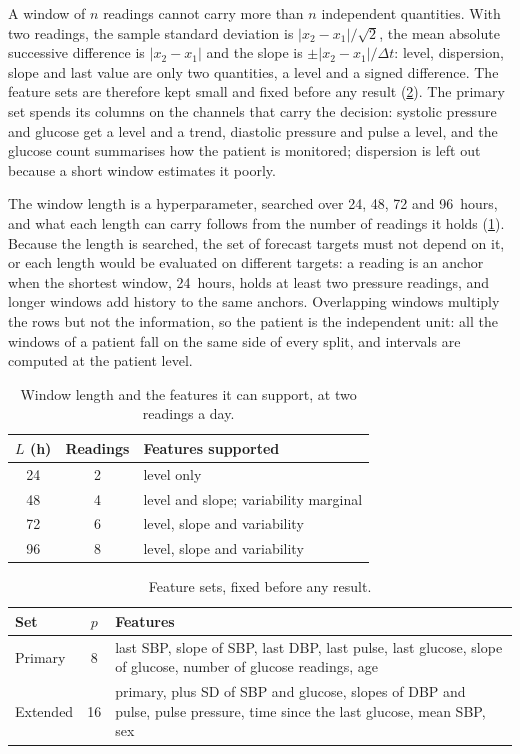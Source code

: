 \documentclass[11pt,a4paper,oneside]{report}
\begin{document}
A window of $n$ readings cannot carry more than $n$ independent quantities. With two readings, the sample standard deviation is $\lvert x_2 - x_1\rvert/\sqrt{2}$, the mean absolute successive difference is $\lvert x_2 - x_1\rvert$ and the slope is $\pm\lvert x_2 - x_1\rvert/\Delta t$: level, dispersion, slope and last value are only two quantities, a level and a signed difference. The feature sets are therefore kept small and fixed before any result (\cref{tab:feature-sets}). The primary set spends its columns on the channels that carry the decision: systolic pressure and glucose get a level and a trend, diastolic pressure and pulse a level, and the glucose count summarises how the patient is monitored; dispersion is left out because a short window estimates it poorly.

The window length is a hyperparameter, searched over 24, 48, 72 and 96~hours, and what each length can carry follows from the number of readings it holds (\cref{tab:window-length}). Because the length is searched, the set of forecast targets must not depend on it, or each length would be evaluated on different targets: a reading is an anchor when the shortest window, 24~hours, holds at least two pressure readings, and longer windows add history to the same anchors. Overlapping windows multiply the rows but not the information, so the patient is the independent unit: all the windows of a patient fall on the same side of every split, and intervals are computed at the patient level.

\begin{table}[htbp]
\centering\footnotesize
\caption{Window length and the features it can support, at two readings a day.}\label{tab:window-length}
\begin{tabular}{@{}ccl@{}}
\toprule
\textbf{$L$ (h)} & \textbf{Readings} & \textbf{Features supported} \\
\midrule
24 & 2 & level only \\
48 & 4 & level and slope; variability marginal \\
72 & 6 & level, slope and variability \\
96 & 8 & level, slope and variability \\
\bottomrule
\end{tabular}
\end{table}

\begin{table}[htbp]
\centering\footnotesize
\caption{Feature sets, fixed before any result.}\label{tab:feature-sets}
\begin{tabularx}{\textwidth}{@{}>{\raggedright\arraybackslash}p{2.2cm} c X@{}}
\toprule
\textbf{Set} & \textbf{$p$} & \textbf{Features} \\
\midrule
Primary & 8 & last SBP, slope of SBP, last DBP, last pulse, last glucose, slope of glucose, number of glucose readings, age \\
Extended & 16 & primary, plus SD of SBP and glucose, slopes of DBP and pulse, pulse pressure, time since the last glucose, mean SBP, sex \\
\bottomrule
\end{tabularx}
\end{table}
\end{document}
